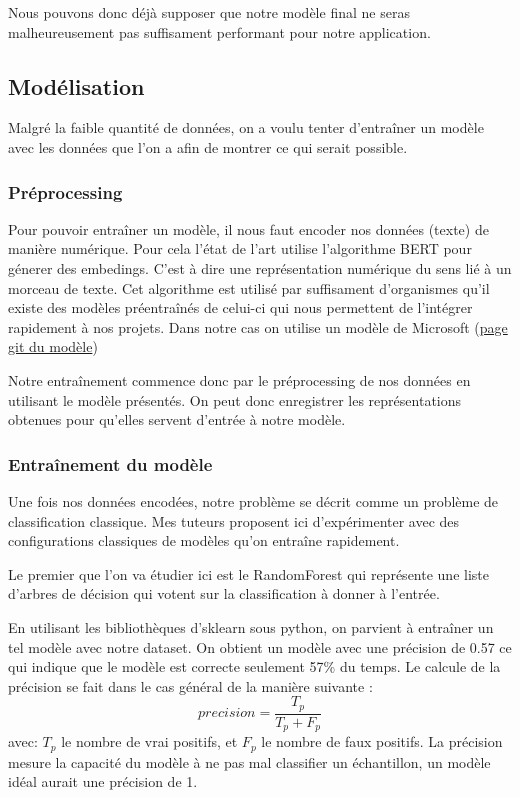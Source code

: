 \documentclass[oneside,a4paper,12pt]{article}
\begin{document}
	Nous pouvons donc déjà supposer que notre modèle final ne seras malheureusement pas suffisament performant pour notre application.
	 
	 
	\subsection{Modélisation}
	\label{training}
	
	Malgré la faible quantité de données, on a voulu tenter d'entraîner un modèle avec les données que l'on a afin de montrer ce qui serait possible.
	
	\subsubsection{Préprocessing}
	\label{preprocessing}
	Pour pouvoir entraîner un modèle, il nous faut encoder nos données (texte) de manière numérique. Pour cela l'état de l'art utilise l'algorithme BERT pour génerer des embedings. C'est à dire une représentation numérique du sens lié à un morceau de texte. Cet algorithme est utilisé par suffisament d'organismes qu'il existe des modèles préentraînés de celui-ci qui nous permettent de l'intégrer rapidement à nos projets. Dans notre cas on utilise un modèle de Microsoft (\href{https://github.com/microsoft/CodeBERT}{page git du modèle})
	
	Notre entraînement commence donc par le préprocessing de nos données en utilisant le modèle présentés. On peut donc enregistrer les représentations obtenues pour qu'elles servent d'entrée à notre modèle.
	
	\subsubsection{Entraînement du modèle}
	Une fois nos données encodées, notre problème se décrit comme un problème de classification classique. Mes tuteurs proposent ici d'expérimenter avec des configurations classiques de modèles qu'on entraîne rapidement.
	
	Le premier que l'on va étudier ici est le RandomForest qui représente une liste d'arbres de décision qui votent sur la classification à donner à l'entrée.
	
	En utilisant les bibliothèques d'sklearn sous python, on parvient à entraîner un tel modèle avec notre dataset.
	On obtient un modèle avec une précision de 0.57 ce qui indique que le modèle est correcte seulement 57\% du temps.
	Le calcule de la précision se fait dans le cas général de la manière suivante :
	$$ precision = \frac{T_p}{T_p + F_p} $$
	avec: $T_p$ le nombre de vrai positifs, et $F_p$ le nombre de faux positifs.
	La précision mesure la capacité du modèle à ne pas mal classifier un échantillon, un modèle idéal aurait une précision de 1.
	
\end{document}
